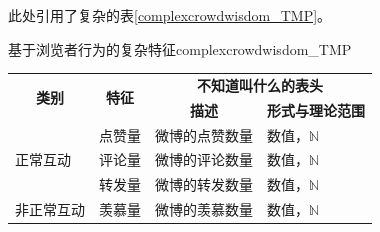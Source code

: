 \documentclass[a4paper,AutoFakeBold,oneside,12pt]{book}
\begin{document}
此处引用了复杂的表\ref{complexcrowdwisdom_TMP}。


\begin{bupttable}{基于浏览者行为的复杂特征}{complexcrowdwisdom_TMP}
	\begin{tabular}{l|l|l|l}
		\hline
		\multicolumn{1}{c|}{\multirow{2}{*}{\textbf{类别}}} & \multicolumn{1}{c|}{\multirow{2}{*}{\textbf{特征}}} & \multicolumn{2}{c}{\textbf{不知道叫什么的表头}}                                               \\
		\cline{3-4}
		                                                    &                                                     & \multicolumn{1}{c|}{\textbf{描述}}              & \multicolumn{1}{c}{\textbf{形式与理论范围}} \\
		\hline
		\multirow{3}{*}{正常互动}                           & 点赞量                                              & 微博的点赞数量                                  & 数值，$\mathbb{N}$                          \\
		\cline{2-4}
		                                                    & 评论量                                              & 微博的评论数量                                  & 数值，$\mathbb{N}$                          \\
		\cline{2-4}
		                                                    & 转发量                                              & 微博的转发数量                                  & 数值，$\mathbb{N}$                          \\
		\hline
		非正常互动                                          & 羡慕量                                              & 微博的羡慕数量                                  & 数值，$\mathbb{N}$                          \\
		\hline
	\end{tabular}
\end{bupttable}
\end{document}
